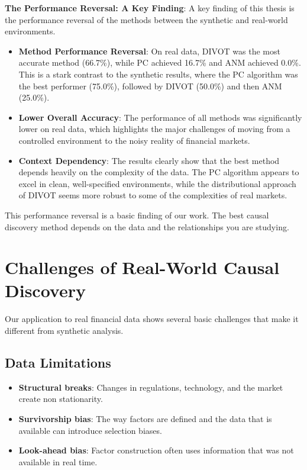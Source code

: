 \textbf{The Performance Reversal: A Key Finding}:
A key finding of this thesis is the performance reversal of the methods between the synthetic and real-world environments.
\begin{itemize}
    \item \textbf{Method Performance Reversal}: On real data, DIVOT was the most accurate method (66.7\%), while PC achieved 16.7\% and ANM achieved 0.0\%. This is a stark contrast to the synthetic results, where the PC algorithm was the best performer (75.0\%), followed by DIVOT (50.0\%) and then ANM (25.0\%).
    \item \textbf{Lower Overall Accuracy}: The performance of all methods was significantly lower on real data, which highlights the major challenges of moving from a controlled environment to the noisy reality of financial markets.
    \item \textbf{Context Dependency}: The results clearly show that the best method depends heavily on the complexity of the data. The PC algorithm appears to excel in clean, well-specified environments, while the distributional approach of DIVOT seems more robust to some of the complexities of real markets.
\end{itemize}

This performance reversal is a basic finding of our work. The best causal discovery method depends on the data and the relationships you are studying.

\section{Challenges of Real-World Causal Discovery}
\label{sec:real_robustness}

Our application to real financial data shows several basic challenges that make it different from synthetic analysis.

\subsection{Data Limitations}
\begin{itemize}
    \item \textbf{Structural breaks}: Changes in regulations, technology, and the market create non stationarity.
    \item \textbf{Survivorship bias}: The way factors are defined and the data that is available can introduce selection biases.
    \item \textbf{Look-ahead bias}: Factor construction often uses information that was not available in real time.
\end{itemize}

